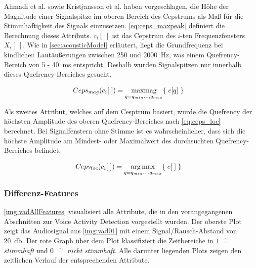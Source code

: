Ahmadi et al. \cite{vad_ceps} sowie Kristjansson et al.\cite{vad_Lisboa} haben vorgeschlagen, die Höhe der Magnitude einer Signalspitze im oberen Bereich des Cepstrums als Maß für die Stimmhaftigkeit des Signals einzusetzen. \autoref{eq:ceps_maxpeak} definiert die Berechnung dieses Attributs. $c_i[\;]$ ist das Cepstrum des $i$-ten Frequenzfensters $X_i[\;]$. Wie in \autoref{sec:acousticModel} erläutert, liegt die Grundfrequenz bei kindlichen Lautäußerungen zwischen 250 und \SI{2000}{\hertz}, was einem Quefrency-Bereich von 5 - \SI{40}{\milli\second} entspricht. Deshalb wurden Signalspitzen nur innerhalb dieses Quefrency-Bereiches gesucht.

\begin{equation}
Ceps_{mag}(c_i[\;]) = \operatorname*{max mag}_{q = q_{min} \ldots , q_{max}}\{ \; c[q] \; \}
\label{eq:ceps_maxpeak}
\end{equation}

Als zweites Attribut, welches auf dem Cesptrum basiert, wurde die Quefrency der höchsten Amplitude des oberen Quefrency-Bereiches nach \autoref{eq:ceps_loc} berechnet. Bei Signalfenstern ohne Stimme ist es wahrscheinlicher, dass sich die höchste Amplitude am Mindest- oder Maximalwert des durchsuchten Quefrency-Bereiches befindet.

\begin{equation}
Ceps_{loc}(c_i[\;]) = \operatorname*{arg\,max}_{q = q_{min} \ldots , q_{max}} \{ \; c[\;] \; \}
\label{eq:ceps_loc}
\end{equation}	

\subsubsection{Differenz-Features}
\label{sec:vad_dif_feature}

\autoref{img:vadAllFeatures} visualisiert alle Attribute, die in den vorangegangenen Abschnitten zur Voice Activity Detection vorgestellt wurden. Der oberste Plot zeigt das Audiosignal aus \autoref{img:vad01} mit einem Signal/Rausch-Abstand von \SI{20}{\decibel}. Der rote Graph über dem Plot klassifiziert die Zeitbereiche in $1 \; \hat{=} $ \emph{stimmhaft} und $0 \; \hat{=}$ \emph{nicht stimmhaft}. Alle darunter liegenden Plots zeigen den zeitlichen Verlauf der entsprechenden Attribute.

